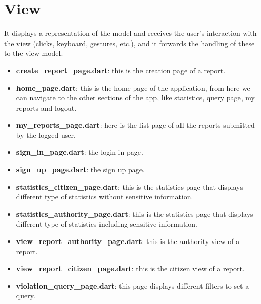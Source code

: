 \documentclass[../ITD.tex]{subfiles}
\begin{document}
    \section{View}\label{sec:view}
    It displays a representation of the model and receives the user's interaction with the view (clicks, keyboard, gestures, etc.), and it forwards the handling of these to the view model.
    \begin{itemize}
        \item \textbf{create\_report\_page.dart}: this is the creation page of a report.
        \item \textbf{home\_page.dart}: this is the home page of the application, from here we can navigate to the other sections of the app, like statistics, query page, my reports and logout.
        \item \textbf{my\_reports\_page.dart}: here is the list page of all the reports submitted by the logged user.
        \item \textbf{sign\_in\_page.dart}: the login in page.
        \item \textbf{sign\_up\_page.dart}: the sign up page.
        \item \textbf{statistics\_citizen\_page.dart}: this is the statistics page that displays different type of statistics without sensitive information.
        \item \textbf{statistics\_authority\_page.dart}: this is the statistics page that displays different type of statistics including sensitive information.
        \item \textbf{view\_report\_authority\_page.dart}: this is the authority view of a report.
        \item \textbf{view\_report\_citizen\_page.dart}: this is the citizen view of a report.
        \item \textbf{violation\_query\_page.dart}: this page displays different filters to set a query.
    \end{itemize}
\end{document}
